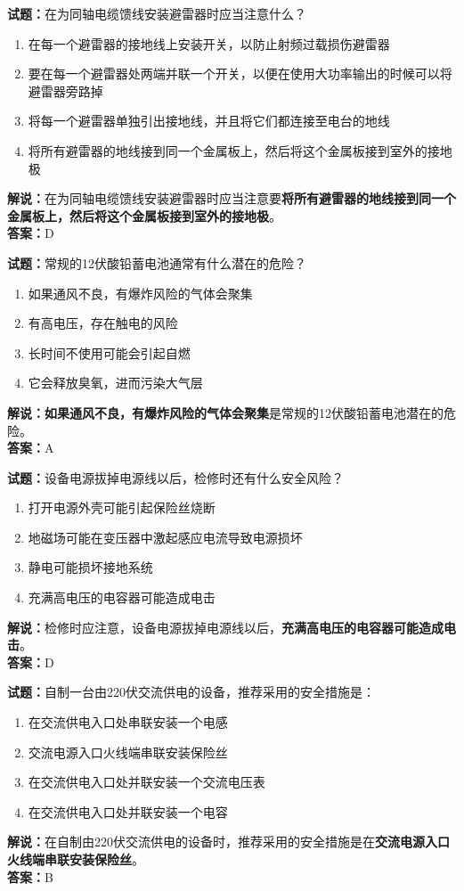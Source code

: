 \documentclass{ctexbook}
\begin{document}
\bigskip

\noindent\textbf{试题：}在为同轴电缆馈线安装避雷器时应当注意什么？
\begin{enumerate}[leftmargin=3em]
  \item 在每一个避雷器的接地线上安装开关，以防止射频过载损伤避雷器
  \item 要在每一个避雷器处两端并联一个开关，以便在使用大功率输出的时候可以将避雷器旁路掉
  \item 将每一个避雷器单独引出接地线，并且将它们都连接至电台的地线
  \item 将所有避雷器的地线接到同一个金属板上，然后将这个金属板接到室外的接地极
\end{enumerate}
\noindent\textbf{解说：}在为同轴电缆馈线安装避雷器时应当注意要\textbf{将所有避雷器的地线接到同一个金属板上，然后将这个金属板接到室外的接地极}。\\\noindent\textbf{答案：}D

\bigskip

\noindent\textbf{试题：}常规的12伏酸铅蓄电池通常有什么潜在的危险？
\begin{enumerate}[leftmargin=3em]
  \item 如果通风不良，有爆炸风险的气体会聚集
  \item 有高电压，存在触电的风险
  \item 长时间不使用可能会引起自燃
  \item 它会释放臭氧，进而污染大气层
\end{enumerate}
\noindent\textbf{解说：}\textbf{如果通风不良，有爆炸风险的气体会聚集}是常规的12伏酸铅蓄电池潜在的危险。\\\noindent\textbf{答案：}A

\bigskip

\noindent\textbf{试题：}设备电源拔掉电源线以后，检修时还有什么安全风险？
\begin{enumerate}[leftmargin=3em]
  \item 打开电源外壳可能引起保险丝烧断
  \item 地磁场可能在变压器中激起感应电流导致电源损坏
  \item 静电可能损坏接地系统
  \item 充满高电压的电容器可能造成电击
\end{enumerate}
\noindent\textbf{解说：}检修时应注意，设备电源拔掉电源线以后，\textbf{充满高电压的电容器可能造成电击}。\\\noindent\textbf{答案：}D

\bigskip

\noindent\textbf{试题：}自制一台由220伏交流供电的设备，推荐采用的安全措施是：
\begin{enumerate}[leftmargin=3em]
  \item 在交流供电入口处串联安装一个电感
  \item 交流电源入口火线端串联安装保险丝
  \item 在交流供电入口处并联安装一个交流电压表
  \item 在交流供电入口处并联安装一个电容
\end{enumerate}
\noindent\textbf{解说：}在自制由220伏交流供电的设备时，推荐采用的安全措施是在\textbf{交流电源入口火线端串联安装保险丝}。\\\noindent\textbf{答案：}B
\end{document}
